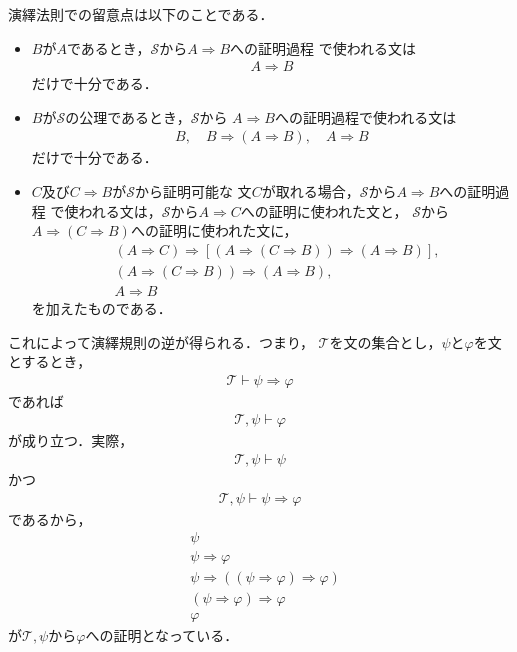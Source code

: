 	演繹法則での留意点は以下のことである．
	\begin{screen}
		\begin{itemize}
			\item $B$が$A$であるとき，$\mathscr{S}$から$A \Longrightarrow B$への証明過程
				で使われる文は
				\begin{align}
					A \Longrightarrow B
				\end{align}
				だけで十分である．
				
			\item $B$が$\mathscr{S}$の公理であるとき，$\mathscr{S}$から
				$A \Longrightarrow B$への証明過程で使われる文は
				\begin{align}
					B,\quad B \Longrightarrow (A \Longrightarrow B),\quad A \Longrightarrow B
				\end{align}
				だけで十分である．
				
			\item $C$及び$C \Longrightarrow B$が$\mathscr{S}$から証明可能な
				文$C$が取れる場合，$\mathscr{S}$から$A \Longrightarrow B$への証明過程
				で使われる文は，$\mathscr{S}$から$A \Longrightarrow C$への証明に使われた文と，
				$\mathscr{S}$から$A \Longrightarrow (C \Longrightarrow B)$への証明に使われた文に，
				\begin{align}
					&(A \Longrightarrow C) \Longrightarrow [(A \Longrightarrow (
					C \Longrightarrow B)) \Longrightarrow (A \Longrightarrow B)], \\
					&(A \Longrightarrow (
					C \Longrightarrow B)) \Longrightarrow (A \Longrightarrow B), \\
					&A \Longrightarrow B
				\end{align}
				を加えたものである．
		\end{itemize}
	\end{screen}
	
	これによって演繹規則の逆が得られる．つまり，
	$\mathscr{T}$を文の集合とし，$\psi$と$\varphi$を文とするとき，
	\begin{align}
		\mathscr{T} \vdash \psi \Longrightarrow \varphi
	\end{align}
	であれば
	\begin{align}
		\mathscr{T},\psi \vdash \varphi
	\end{align}
	が成り立つ．実際，
	\begin{align}
		\mathscr{T},\psi \vdash \psi
	\end{align}
	かつ
	\begin{align}
		\mathscr{T},\psi \vdash \psi \Longrightarrow \varphi
	\end{align}
	であるから，
	\begin{align}
		&\psi \\
		&\psi \Longrightarrow \varphi \\
		&\psi \Longrightarrow ((\psi \Longrightarrow \varphi) \Longrightarrow \varphi) \\
		&(\psi \Longrightarrow \varphi) \Longrightarrow \varphi \\
		&\varphi
	\end{align}
	が$\mathscr{T},\psi$から$\varphi$への証明となっている．
	
